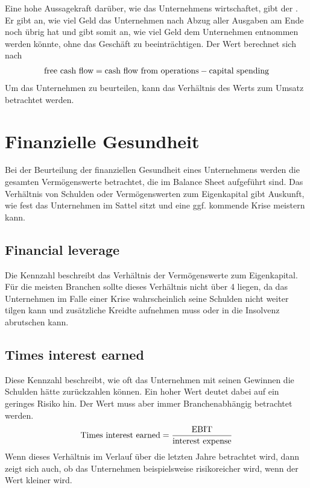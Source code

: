 Eine hohe Aussagekraft darüber, wie das Unternehmens wirtschaftet, gibt der \textbf{\freeCashFlow}.
Er gibt an, wie viel Geld das Unternehmen nach Abzug aller Ausgaben am Ende noch übrig hat und gibt somit an, wie viel Geld dem Unternehmen entnommen werden könnte, ohne das Geschäft zu beeinträchtigen.
Der Wert berechnet sich nach
\begin{align}
    \text{free cash flow} = \text{cash flow from operations} - \text{capital spending}
\end{align}
Um das Unternehmen zu beurteilen, kann das Verhältnis des Werts zum Umsatz betrachtet werden.

%
\section{Finanzielle Gesundheit}

Bei der Beurteilung der finanziellen Gesundheit eines Unternehmens werden die gesamten Vermögenswerte betrachtet, die im Balance Sheet aufgeführt sind.
Das Verhältnis von Schulden oder Vermögenswerten zum Eigenkapital gibt Auskunft, wie fest das Unternehmen im Sattel sitzt und eine ggf. kommende Krise meistern kann.

%
\subsection{Financial leverage}

Die Kennzahl beschreibt das Verhältnis der Vermögenswerte zum Eigenkapital. 
Für die meisten Branchen sollte dieses Verhältnis nicht über 4 liegen, da das Unternehmen im Falle einer Krise wahrscheinlich seine Schulden nicht weiter tilgen kann und zusätzliche Kreidte aufnehmen muss oder in die Insolvenz abrutschen kann.

%
\subsection{Times interest earned}

Diese Kennzahl beschreibt, wie oft das Unternehmen mit seinen Gewinnen die Schulden hätte zurückzahlen können. 
Ein hoher Wert deutet dabei auf ein geringes Risiko hin. 
Der Wert muss aber immer Branchenabhängig betrachtet werden.
\begin{equation}
    \text{Times interest earned} = \frac{\text{EBIT}}{\text{interest expense}}
\end{equation}
Wenn dieses Verhältnis im Verlauf über die letzten Jahre betrachtet wird, dann zeigt sich auch, ob das Unternehmen beispielsweise risikoreicher wird, wenn der Wert kleiner wird.\\

